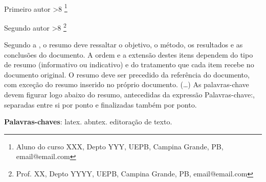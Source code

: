 \documentclass[article,12pt,oneside,a4paper,chapter=TITLE,
			   english,brazil]{abntex2}
\newcounter{savefootnote}
\newcounter{symfootnote}
\newcommand{\symfootnote}[1]{%
	\setcounter{savefootnote}{\value{footnote}}%
	\setcounter{footnote}{\value{symfootnote}}%
	\ifnum\value{footnote}>8\setcounter{footnote}{0}\fi%
	\let\oldthefootnote=\thefootnote%
	\renewcommand{\thefootnote}{\fnsymbol{footnote}}%
	\footnote{#1}%
	\let\thefootnote=\oldthefootnote%
	\setcounter{symfootnote}{\value{footnote}}%
	\setcounter{footnote}{\value{savefootnote}}%
}
\begin{document}
\tableofcontents*
\cleardoublepage


\textual


\begin{center}
  {\ABNTEXchapterfont\bfseries\MakeUppercase{\imprimirtitulo}} \\
  \vspace{\onelineskip}
  {\ABNTEXchapterfont\bfseries\MakeUppercase{\imprimirtituloestrangeiro}} 
\end{center}   %


\vspace{\onelineskip}
\hfill Primeiro autor\symfootnote{Aluno do curso XXX, Depto YYY, UEPB, Campina Grande, PB, email@email.com}

\hfill Segundo autor\symfootnote{Prof. XX, Depto YYYY, UEPB, Campina Grande, PB, email@email.com}



\setlength{\absparsep}{18pt} %
\begin{resumo}
	Segundo a , o resumo deve ressaltar o objetivo, o método, os resultados e as conclusões do documento. A ordem e a extensão destes itens dependem do tipo de resumo (informativo ou indicativo) e do tratamento que cada item recebe no documento original. O resumo deve ser precedido da referência do documento, com exceção do resumo inserido no próprio documento. (\ldots) As palavras-chave devem figurar logo abaixo do resumo, antecedidas da expressão Palavras-chave:, separadas entre si por ponto e finalizadas também por ponto.
	
	\textbf{Palavras-chaves}: latex. abntex. editoração de texto.
\end{resumo}
\end{document}
